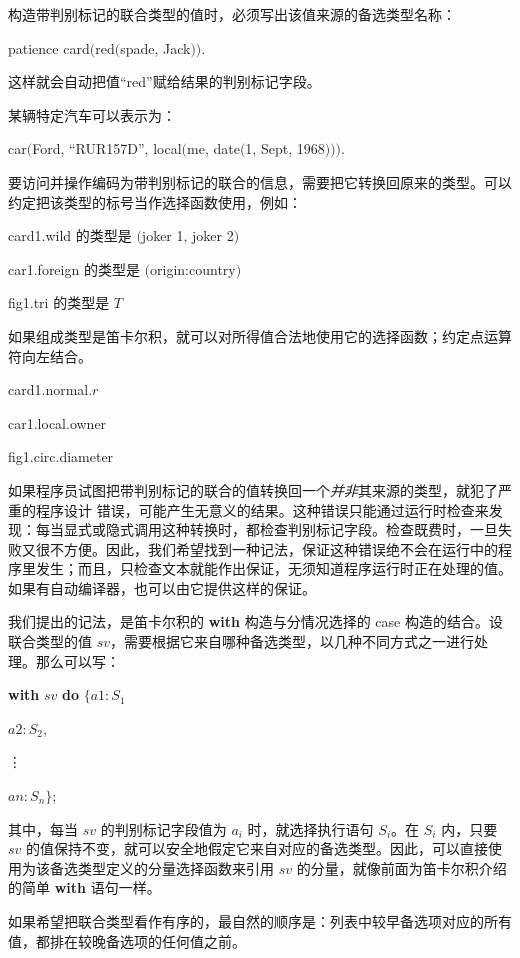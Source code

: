 构造带判别标记的联合类型的值时，必须写出该值来源的备选类型名称：
\smallskip

\quad patience card$($red$($spade, Jack$))$.
\smallskip

\noindent
这样就会自动把值“red”赋给结果的判别标记字段。

某辆特定汽车可以表示为：
\smallskip

\quad car$($Ford, ``RUR157D'', local$($me, date$($1, Sept, 1968$)))$.
\smallskip

要访问并操作编码为带判别标记的联合的信息，需要把它转换回原来的类型。可以约定把该类型的标号当作选择函数使用，例如：

card1.wild \tabto*{8em} 的类型是 $($joker 1, joker 2$)$

car1.foreign \tabto*{8em} 的类型是 $($origin:country$)$

fig1.tri \tabto*{8em} 的类型是 $T$

\noindent
如果组成类型是笛卡尔积，就可以对所得值合法地使用它的选择函数；约定点运算符向左结合。

\quad card1.normal.$r$

\quad car1.local.owner

\quad fig1.circ.diameter

如果程序员试图把带判别标记的联合的值转换回一个\textit{并非}其来源的类型，就犯了严重的程序设计
错误，可能产生无意义的结果。这种错误只能通过运行时检查来发现：每当显式或隐式调用这种转换时，都检查判别标记字段。检查既费时，一旦失败又很不方便。因此，我们希望找到一种记法，保证这种错误绝不会在运行中的程序里发生；而且，只检查文本就能作出保证，无须知道程序运行时正在处理的值。如果有自动编译器，也可以由它提供这样的保证。

我们提出的记法，是笛卡尔积的 \textbf{with} 构造与分情况选择的 case 构造的结合。设联合类型的值 $sv$，需要根据它来自哪种备选类型，以几种不同方式之一进行处理。那么可以写：

\quad \textbf{with} $sv$ \textbf{do} $\{a1:S_1$

\tabto*{7.6em}$a2:S_2$,
\smallskip

\tabto*{8.85em}\vdots

\tabto*{7.6em}$an:S_n\}$;

\noindent
其中，每当 $sv$ 的判别标记字段值为 $a_i$ 时，就选择执行语句 $S_i$。在 $S_i$ 内，只要 $sv$ 的值保持不变，就可以安全地假定它来自对应的备选类型。因此，可以直接使用为该备选类型定义的分量选择函数来引用 $sv$ 的分量，就像前面为笛卡尔积介绍的简单 \textbf{with} 语句一样。

如果希望把联合类型看作有序的，最自然的顺序是：列表中较早备选项对应的所有值，都排在较晚备选项的任何值之前。

